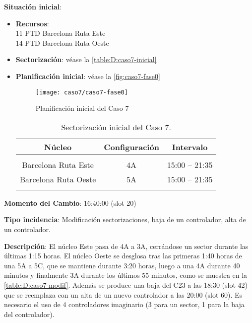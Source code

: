 \textbf{Situación inicial}:
\begin{itemize}[label={}]
	
	\item \textbf{Recursos}: \\
	11 PTD Barcelona Ruta Este \\
	14 PTD Barcelona Ruta Oeste
	
	\item \textbf{Sectorización}: véase la \autoref{table:D:caso7-inicial}
	
	\item \textbf{Planificación inicial}: véase la \autoref{fig:caso7-fase0}
	
	\begin{figure}[!h]
		\centering
		\texttt{[image: caso7/caso7-fase0]}
		\caption{Planificación inicial del Caso 7}
		\label{fig:caso7-fase0}
	\end{figure}

	\begin{table}[h]
		\centering
		\caption{Sectorización inicial del Caso 7.}
		\label{table:D:caso7-inicial}
		\begin{tabular}{ccc}
			\hline
			\multicolumn{1}{c}{\textbf{Núcleo}} & \multicolumn{1}{c}{\textbf{Configuración}} & \multicolumn{1}{c}{\textbf{Intervalo}} \\ \hline
			&                                            &                                        \\
			Barcelona Ruta Este                 & 4A                                         & 15:00 -- 21:35                         \\
			Barcelona Ruta   Oeste              & 5A                                         & 15:00 -- 21:35                         \\
			\multicolumn{1}{c}{}                &                                            &                                        \\ \hline
		\end{tabular}
	\end{table}
\end{itemize}

\textbf{Momento del Cambio}: 16:40:00 (slot 20)

\textbf{Tipo incidencia}: Modificación sectorizaciones, baja de un controlador, alta de un controlador.

\textbf{Descripción}: El núcleo Este pasa de 4A a 3A, cerrándose un sector durante las últimas 1:15 horas. El núcleo Oeste se desglosa tras las primeras 1:40 horas de una 5A a 5C, que se mantiene durante 3:20 horas, luego a una 4A durante 40 minutos y finalmente 3A durante los últimos 55 minutos, como se muestra en la \autoref{table:D:caso7-modif}. Además se produce una baja del C23 a las 18:30 (slot 42) que se reemplaza con un alta de un nuevo controlador a las 20:00 (slot 60). Es necesario el uso de 4 controladores imaginario (3 para un sector, 1 para la baja del controlador).

